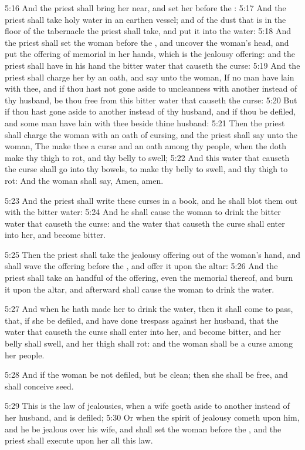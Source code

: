 5:16 And the priest shall bring her near, and set her before the \LORD:
5:17 And the priest shall take holy water in an earthen vessel; and of
the dust that is in the floor of the tabernacle the priest shall take,
and put it into the water: 5:18 And the priest shall set the woman
before the \LORD, and uncover the woman's head, and put the offering of
memorial in her hands, which is the jealousy offering: and the priest
shall have in his hand the bitter water that causeth the curse: 5:19
And the priest shall charge her by an oath, and say unto the woman, If
no man have lain with thee, and if thou hast not gone aside to
uncleanness with another instead of thy husband, be thou free from
this bitter water that causeth the curse: 5:20 But if thou hast gone
aside to another instead of thy husband, and if thou be defiled, and
some man have lain with thee beside thine husband: 5:21 Then the
priest shall charge the woman with an oath of cursing, and the priest
shall say unto the woman, The \LORD make thee a curse and an oath among
thy people, when the \LORD doth make thy thigh to rot, and thy belly to
swell; 5:22 And this water that causeth the curse shall go into thy
bowels, to make thy belly to swell, and thy thigh to rot: And the
woman shall say, Amen, amen.

5:23 And the priest shall write these curses in a book, and he shall
blot them out with the bitter water: 5:24 And he shall cause the woman
to drink the bitter water that causeth the curse: and the water that
causeth the curse shall enter into her, and become bitter.

5:25 Then the priest shall take the jealousy offering out of the
woman's hand, and shall wave the offering before the \LORD, and offer
it upon the altar: 5:26 And the priest shall take an handful of the
offering, even the memorial thereof, and burn it upon the altar, and
afterward shall cause the woman to drink the water.

5:27 And when he hath made her to drink the water, then it shall come
to pass, that, if she be defiled, and have done trespass against her
husband, that the water that causeth the curse shall enter into her,
and become bitter, and her belly shall swell, and her thigh shall rot:
and the woman shall be a curse among her people.

5:28 And if the woman be not defiled, but be clean; then she shall be
free, and shall conceive seed.

5:29 This is the law of jealousies, when a wife goeth aside to another
instead of her husband, and is defiled; 5:30 Or when the spirit of
jealousy cometh upon him, and he be jealous over his wife, and shall
set the woman before the \LORD, and the priest shall execute upon her
all this law.

